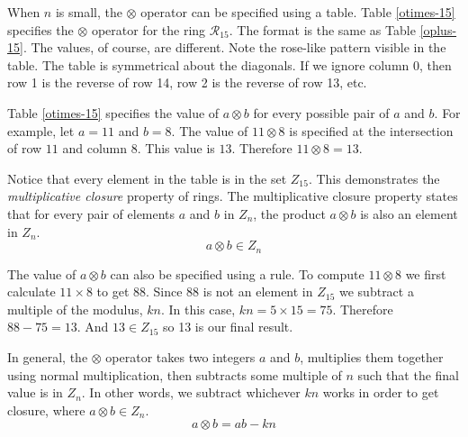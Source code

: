 
When $n$ is small, the $\otimes$ operator can be specified using a table.
Table \ref{otimes-15} specifies the $\otimes$ operator for the ring $\mathcal{R}_{15}$.
The format is the same as Table \ref{oplus-15}.  The values, of course, are different.
Note the rose-like pattern visible in the table.
The table is symmetrical about the diagonals.
If we ignore column 0, then
row 1 is the reverse of row 14, row 2 is the reverse of row 13, etc.

\vspace{2ex}
\begin{table}[!ht]
  \begin{center}
    
    \caption{$a \otimes b \quad (\mathcal{R}_{15})$}
    \label{otimes-15}
  \end{center}
\end{table}

Table \ref{otimes-15} specifies the value of $a \otimes b$ for every possible pair of $a$ and $b$.
For example, let $a=11$ and $b=8$.
The value of $11 \otimes 8$ is specified at the intersection of row $11$ and column $8$.
This value is $13$.  Therefore $11 \otimes 8 = 13$.

Notice that every element in the table is in the set $Z_{15}$.
This demonstrates the \emph{multiplicative closure} property of rings.
The multiplicative closure property states that for every pair of elements $a$ and $b$ in $Z_n$,
the product $a \otimes b$ is also an element in $Z_n$.
\[ a \otimes b \in Z_n \]

The value of $a \otimes b$ can also be specified using a rule.
To compute $11 \otimes 8$ we first calculate $11 \times 8$ to get 88.
Since 88 is not an element in $Z_{15}$ we subtract a multiple of the modulus, $kn$.
In this case, $kn = 5 \times 15 = 75$.  Therefore $88 - 75 = 13$.
And $13 \in Z_{15}$ so 13 is our final result.

In general, the $\otimes$ operator takes two integers $a$ and $b$, 
multiplies them together using normal multiplication, 
then subtracts some multiple of $n$ such that the final value is in $Z_n$.
In other words, we subtract whichever $kn$ works in order to get closure, 
where $a \otimes b \in Z_n$.
\[  a \otimes b = ab - kn  \]

